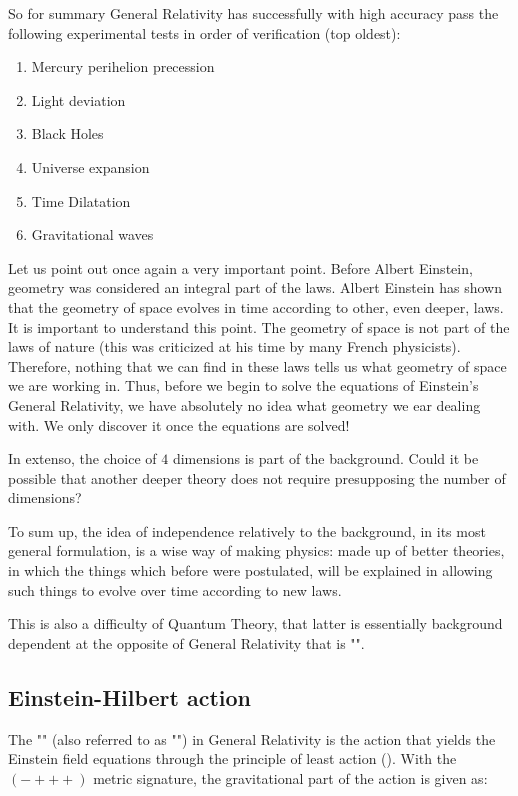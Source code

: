 	So for summary General Relativity has successfully with high accuracy pass the following experimental tests in order of verification (top oldest):
	\begin{enumerate}
		\item Mercury perihelion precession
		\item Light deviation
		\item Black Holes
		\item Universe expansion
		\item Time Dilatation
		\item Gravitational waves
	\end{enumerate}	

	Let us point out once again a very important point. Before Albert Einstein, geometry was considered an integral part of the laws. Albert Einstein has shown that the geometry of space evolves in time according to other, even deeper, laws. It is important to understand this point. The geometry of space is not part of the laws of nature (this was criticized at his time by many French physicists). Therefore, nothing that we can find in these laws tells us what geometry of space we are working in. Thus, before we begin to solve the equations of Einstein's General Relativity, we have absolutely no idea what geometry we ear dealing with. We only discover it once the equations are solved!
	
	In extenso, the choice of $4$ dimensions is part of the background. Could it be possible that another deeper theory does not require presupposing the number of dimensions? 

	To sum up, the idea of independence relatively to the background, in its most general formulation, is a wise way of making physics: made up of better theories, in which the things which before were postulated, will be explained in allowing such things to evolve over time according to new laws.

	This is also a difficulty of Quantum Theory, that latter is essentially background dependent at the opposite of General Relativity that is "".
	
	\subsection{Einstein-Hilbert action}
	The "" (also referred to as "") in General Relativity is the action that yields the Einstein field equations through the principle of least action (). With the $(- + + +)$ metric signature, the gravitational part of the action is given as:
	
